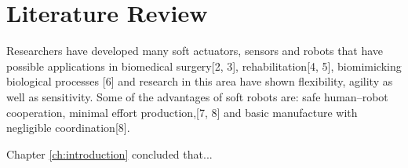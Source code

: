 \chapter{Literature Review}\label{ch:litreview} %

Researchers have developed many soft actuators, sensors and robots that have possible applications in biomedical surgery[2, 3], rehabilitation[4, 5], biomimicking biological processes [6] and research in this area have shown flexibility, agility as well as sensitivity. Some of the advantages of soft robots are: safe human–robot cooperation, minimal effort production,[7, 8] and basic manufacture with negligible coordination[8].

Chapter \ref{ch:introduction} concluded that... 
